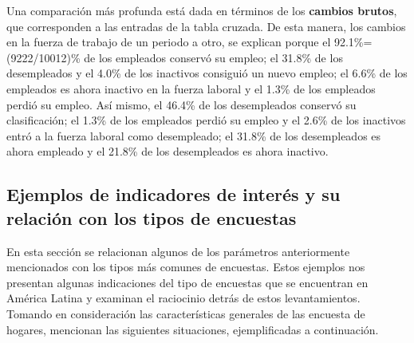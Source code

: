 Una comparación más profunda está dada en términos de los \textbf{cambios brutos}, que corresponden a las entradas de la tabla cruzada. De esta manera, los cambios en la fuerza de trabajo de un periodo a otro, se explican porque el 92.1\%=(9222/10012)\% de los empleados conservó su empleo; el 31.8\% de los desempleados y el 4.0\% de los inactivos consiguió un nuevo empleo; el 6.6\% de los empleados es ahora inactivo en la fuerza laboral y el 1.3\% de los empleados perdió su empleo. Así mismo, el 46.4\% de los desempleados conservó su clasificación; el 1.3\% de los empleados perdió su empleo y el 2.6\% de los inactivos entró a la fuerza laboral como desempleado; el 31.8\% de los desempleados es ahora empleado y el 21.8\% de los desempleados es ahora inactivo.

\hypertarget{ejemplos-de-indicadores-de-interes-y-su-relacion-con-los-tipos-de-encuestas}{%
\subsection{Ejemplos de indicadores de interés y su relación con los tipos de encuestas}\label{ejemplos-de-indicadores-de-interes-y-su-relacion-con-los-tipos-de-encuestas}}

En esta sección se relacionan algunos de los parámetros anteriormente mencionados con los tipos más comunes de encuestas. Estos ejemplos nos presentan algunas indicaciones del tipo de encuestas que se encuentran en América Latina y examinan el raciocinio detrás de estos levantamientos. Tomando en consideración las características generales de las encuesta de hogares, \citet{Duncan_Kalton_1987} mencionan las siguientes situaciones, ejemplificadas a continuación.

